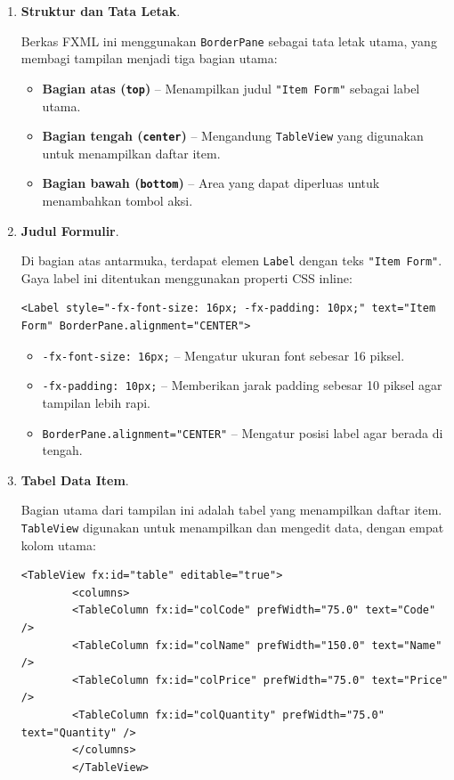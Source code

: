 \begin{enumerate}
	\item \textbf{Struktur dan Tata Letak}.
	
	Berkas FXML ini menggunakan \texttt{BorderPane} sebagai tata letak utama, yang membagi tampilan menjadi tiga bagian utama:
	
	\begin{itemize}
		\item \textbf{Bagian atas (\texttt{top})} – Menampilkan judul \texttt{"Item Form"} sebagai label utama.
		\item \textbf{Bagian tengah (\texttt{center})} – Mengandung \texttt{TableView} yang digunakan untuk menampilkan daftar item.
		\item \textbf{Bagian bawah (\texttt{bottom})} – Area yang dapat diperluas untuk menambahkan tombol aksi.
	\end{itemize}
	
	\item \textbf{Judul Formulir}.
	
	Di bagian atas antarmuka, terdapat elemen \texttt{Label} dengan teks \texttt{"Item Form"}. Gaya label ini ditentukan menggunakan properti CSS inline:
	
	\begin{lstlisting}[style=XmlStyle]
		<Label style="-fx-font-size: 16px; -fx-padding: 10px;" text="Item Form" BorderPane.alignment="CENTER">
	\end{lstlisting}
	
	\begin{itemize}
		\item \texttt{-fx-font-size: 16px;} – Mengatur ukuran font sebesar 16 piksel.
		\item \texttt{-fx-padding: 10px;} – Memberikan jarak padding sebesar 10 piksel agar tampilan lebih rapi.
		\item \texttt{BorderPane.alignment="CENTER"} – Mengatur posisi label agar berada di tengah.
	\end{itemize}
	
	\item \textbf{Tabel Data Item}.
	
	Bagian utama dari tampilan ini adalah tabel yang menampilkan daftar item. \texttt{TableView} digunakan untuk menampilkan dan mengedit data, dengan empat kolom utama:
	
	\begin{lstlisting}[style=XmlStyle]
		<TableView fx:id="table" editable="true">
		<columns>
		<TableColumn fx:id="colCode" prefWidth="75.0" text="Code" />
		<TableColumn fx:id="colName" prefWidth="150.0" text="Name" />
		<TableColumn fx:id="colPrice" prefWidth="75.0" text="Price" />
		<TableColumn fx:id="colQuantity" prefWidth="75.0" text="Quantity" />
		</columns>
		</TableView>
	\end{lstlisting}
	

\end{enumerate}
